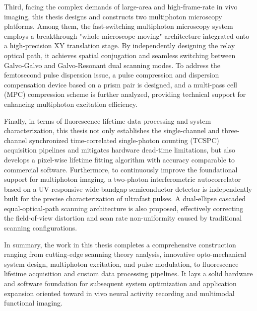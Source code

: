 Third, facing the complex demands of large-area and high-frame-rate in vivo imaging, this thesis designs and constructs two multiphoton microscopy platforms. Among them, the fast-switching multiphoton microscopy system employs a breakthrough "whole-microscope-moving" architecture integrated onto a high-precision XY translation stage. By independently designing the relay optical path, it achieves spatial conjugation and seamless switching between Galvo-Galvo and Galvo-Resonant dual scanning modes. To address the femtosecond pulse dispersion issue, a pulse compression and dispersion compensation device based on a prism pair is designed, and a multi-pass cell (MPC) compression scheme is further analyzed, providing technical support for enhancing multiphoton excitation efficiency.

Finally, in terms of fluorescence lifetime data processing and system characterization, this thesis not only establishes the single-channel and three-channel synchronized time-correlated single-photon counting (TCSPC) acquisition pipelines and mitigates hardware dead-time limitations, but also develops a pixel-wise lifetime fitting algorithm with accuracy comparable to commercial software. Furthermore, to continuously improve the foundational support for multiphoton imaging, a two-photon interferometric autocorrelator based on a UV-responsive wide-bandgap semiconductor detector is independently built for the precise characterization of ultrafast pulses. A dual-ellipse cascaded equal-optical-path scanning architecture is also proposed, effectively correcting the field-of-view distortion and scan rate non-uniformity caused by traditional scanning configurations.

In summary, the work in this thesis completes a comprehensive construction ranging from cutting-edge scanning theory analysis, innovative opto-mechanical system design, multiphoton excitation, and pulse modulation, to fluorescence lifetime acquisition and custom data processing pipelines. It lays a solid hardware and software foundation for subsequent system optimization and application expansion oriented toward in vivo neural activity recording and multimodal functional imaging.


\pagestyle{enfrontmatterstyle}%
\cleardoublepage\pagestyle{frontmatterstyle}%

